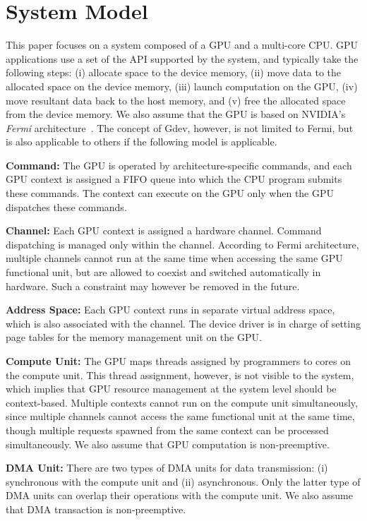 \vspace{-0.25em}
\section{System Model}
\label{sec:model}
\vspace{-0.25em}

This paper focuses on a system composed of a GPU and a multi-core CPU.
GPU applications use a set of the API supported by the system, and
typically take the following steps:
(i) allocate space to the device memory, 
(ii) move data to the allocated space on the device memory, 
(iii) launch computation on the GPU, 
(iv) move resultant data back to the host memory, and 
(v) free the allocated space from the device memory.
We also assume that the GPU is based on NVIDIA's \textit{Fermi}
architecture~\cite{Fermi}.
The concept of Gdev, however, is not limited to Fermi, but is also
applicable to others if the following model is applicable.

\textbf{Command:}
The GPU is operated by architecture-specific commands, and each GPU
context is assigned a FIFO queue into which the CPU program submits
these commands.
The context can execute on the GPU only when the GPU dispatches these
commands.

\textbf{Channel:}
Each GPU context is assigned a hardware channel.
Command dispatching is managed only within the channel.
According to Fermi architecture, multiple channels cannot run
at the same time when accessing the same GPU functional unit, but are
allowed to coexist and switched automatically in hardware.
Such a constraint may however be removed in the future.

\textbf{Address Space:}
Each GPU context runs in separate virtual address space, which is also
associated with the channel.
The device driver is in charge of setting page tables for the memory
management unit on the GPU.

\begin{comment}
\textbf{I/O Register:}
The GPU provides a bunch of memory-mapped I/O registers per context
visible to the device driver through the (PCI) I/O bus.
The device driver needs to manage these registers to send commands and
set up channels and address space.
\end{comment}

\textbf{Compute Unit:}
The GPU maps threads assigned by programmers to cores on the compute unit.
This thread assignment, however, is not visible to the system, which
implies that GPU resource management at the system level should be
context-based. 
Multiple contexts cannot run on the compute unit simultaneously, since
multiple channels cannot access the same functional unit at the same
time, though multiple requests spawned from the same context can be
processed simultaneously.
We also assume that GPU computation is non-preemptive.

\textbf{DMA Unit:}
There are two types of DMA units for data transmission: (i) synchronous
with the compute unit and (ii) asynchronous.
Only the latter type of DMA units can overlap their operations with the
compute unit.
We also assume that DMA transaction is non-preemptive.
